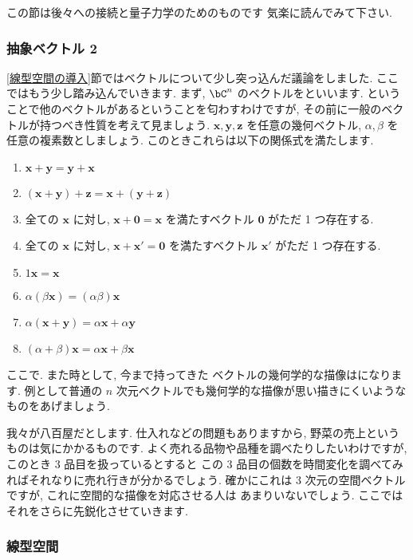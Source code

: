 \documentclass[openany, a4paper, oneside]{jsbook}
\begin{document}
この節は後々への接続と量子力学のためのものです
気楽に読んでみて下さい.
\subsubsection{抽象ベクトル 2}

\ref{線型空間の導入}節ではベクトルについて少し突っ込んだ議論をしました.
ここではもう少し踏み込んでいきます.
まず,  $\bC^n$ のベクトルをといいます.
ということで他のベクトルがあるということを匂わすわけですが,
その前に一般のベクトルが持つべき性質を考えて見ましょう.
 $\bm{x},\bm{y},\bm{z}$ を任意の幾何ベクトル,  $\alpha, \beta$ を任意の複素数としましょう.
このときこれらは以下の関係式を満たします.
\begin{enumerate}
    \item  $\bm{x} + \bm{y} = \bm{y} + \bm{x}$
    \item  $(\bm{x} + \bm{y} ) + \bm{z} = \bm{x} + ( \bm{y} + \bm{z})$
    \item 全ての $\bm{x}$ に対し,  $\bm{x} + \bm{0} = \bm{x}$ を満たすベクトル $\bm{0}$ がただ 1 つ存在する.
    \item 全ての $\bm{x}$ に対し,  $\bm{x} + \bm{x}' = \bm{0}$ を満たすベクトル $\bm{x}'$ がただ 1 つ存在する.
    \item  $1\bm{x} = \bm{x}$
    \item  $\alpha (\beta \bm{x}) = (\alpha \beta) \bm{x}$
    \item  $\alpha (\bm{x} + \bm{y} ) = \alpha \bm{x} + \alpha \bm{y}$
    \item  $(\alpha + \beta ) \bm{x} = \alpha \bm{x} + \beta \bm{x}$
\end{enumerate}

ここで. また時として, 今まで持ってきた
ベクトルの幾何学的な描像はになります.
例として普通の $n$ 次元ベクトルでも幾何学的な描像が思い描きにくいようなものをあげましょう.

我々が八百屋だとします. 仕入れなどの問題もありますから, 野菜の売上というものは気にかかるものです.
よく売れる品物や品種を調べたりしたいわけですが, このとき $3$ 品目を扱っているとすると
この $3$ 品目の個数を時間変化を調べてみればそれなりに売れ行きが分かるでしょう.
確かにこれは $3$ 次元の空間ベクトルですが, これに空間的な描像を対応させる人は
あまりいないでしょう.
ここではそれをさらに先鋭化させていきます.
\subsubsection{線型空間}
\end{document}
